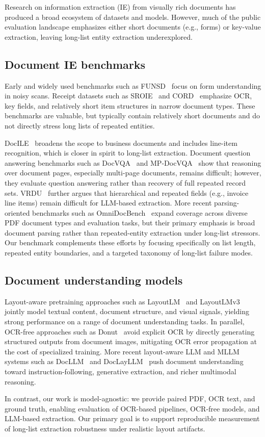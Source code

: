 Research on information extraction (IE) from visually rich documents has produced a broad ecosystem of datasets and models. However, much of the public evaluation landscape emphasizes either short documents (e.g., forms) or key-value extraction, leaving long-list entity extraction underexplored.

\subsection{Document IE benchmarks}
Early and widely used benchmarks such as FUNSD~\cite{jaume2019funsd} focus on form understanding in noisy scans. Receipt datasets such as SROIE~\cite{huang2021sroie} and CORD~\cite{park2019cord} emphasize OCR, key fields, and relatively short item structures in narrow document types. These benchmarks are valuable, but typically contain relatively short documents and do not directly stress long lists of repeated entities.

DocILE~\cite{simsa2023docile} broadens the scope to business documents and includes line-item recognition, which is closer in spirit to long-list extraction. Document question answering benchmarks such as DocVQA~\cite{mathew2021docvqa} and MP-DocVQA~\cite{tito2022mpdocvqa} show that reasoning over document pages, especially multi-page documents, remains difficult; however, they evaluate question answering rather than recovery of full repeated record sets. VRDU~\cite{wang2023vrdu} further argues that hierarchical and repeated fields (e.g., invoice line items) remain difficult for LLM-based extraction. More recent parsing-oriented benchmarks such as OmniDocBench~\cite{ouyang2024omnidocbench} expand coverage across diverse PDF document types and evaluation tasks, but their primary emphasis is broad document parsing rather than repeated-entity extraction under long-list stressors. Our benchmark complements these efforts by focusing specifically on list length, repeated entity boundaries, and a targeted taxonomy of long-list failure modes.

\subsection{Document understanding models}
Layout-aware pretraining approaches such as LayoutLM~\cite{xu2020layoutlm} and LayoutLMv3~\cite{huang2022layoutlmv3} jointly model textual content, document structure, and visual signals, yielding strong performance on a range of document understanding tasks. In parallel, OCR-free approaches such as Donut~\cite{kim2022donut} avoid explicit OCR by directly generating structured outputs from document images, mitigating OCR error propagation at the cost of specialized training. More recent layout-aware LLM and MLLM systems such as DocLLM~\cite{wang2024docllm} and DocLayLLM~\cite{liao2024doclayllm} push document understanding toward instruction-following, generative extraction, and richer multimodal reasoning.

In contrast, our work is model-agnostic: we provide paired PDF, OCR text, and ground truth, enabling evaluation of OCR-based pipelines, OCR-free models, and LLM-based extraction. Our primary goal is to support reproducible measurement of long-list extraction robustness under realistic layout artifacts.
